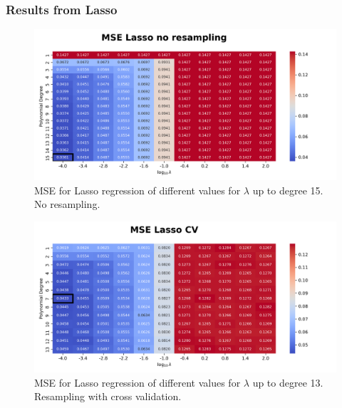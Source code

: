 \documentclass{article}
\begin{document}
\newpage
\subsubsection{Results from Lasso}
\begin{figure}[htbp]
    \centering
    \includegraphics[width=\textwidth]{Project1/figures/Franke/Heatmap_MSE_Lasso_no_resampling.png}
    \caption{MSE for Lasso regression of different values for $\lambda$ up to degree 15. No resampling.}
    \label{fig:LassoNoResamp}
\end{figure}

\begin{figure}[htbp]
    \centering
    \includegraphics[width=\textwidth]{Project1/figures/Franke/Heatmap_MSE_Lasso_CV.png}
    \caption{MSE for Lasso regression of different values for $\lambda$ up to degree 13. Resampling with cross validation.}
    \label{fig:LassoCV}
\end{figure}
\end{document}
